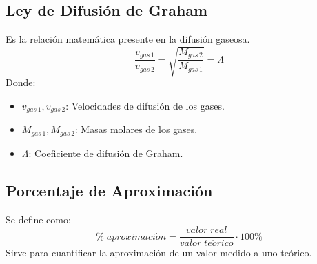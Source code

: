 \documentclass[../main.tex]{subfiles}
\begin{document}
\subsection{Ley de Difusión de Graham}
Es la relación matemática presente en la difusión gaseosa.
\begin{equation} \label{diffusion_eq} 
    \frac{v_{gas\, 1}}{v_{gas\, 2}} =
    \sqrt{\frac{M_{gas\, 2}}{M_{gas\, 1}}} =
    \Lambda
\end{equation}
Donde:
\begin{itemize}
    \item $v_{gas\, 1}, v_{gas\, 2}$: Velocidades de difusión de los gases.
    \item $M_{gas\, 1}, M_{gas\, 2}$: Masas molares de los gases.
    \item $\Lambda$: Coeficiente de difusión de Graham.
\end{itemize}

\subsection{Porcentaje de Aproximación}
Se define como:
\[ \% \; aproximaci\acute{o}n = \frac{valor\; real}{valor\; te\acute{o}rico} \cdot 100\%\]
Sirve para cuantificar la aproximación de un valor medido a uno teórico.
\end{document}
